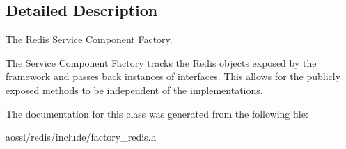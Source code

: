 \subsection{Detailed Description}
The Redis Service Component Factory. 

The Service Component Factory tracks the Redis objects exposed by the framework and passes back instances of interfaces. This allows for the publicly exposed methods to be independent of the implementations. 

The documentation for this class was generated from the following file\+:\begin{DoxyCompactItemize}
\item 
aossl/redis/include/factory\+\_\+redis.\+h\end{DoxyCompactItemize}

